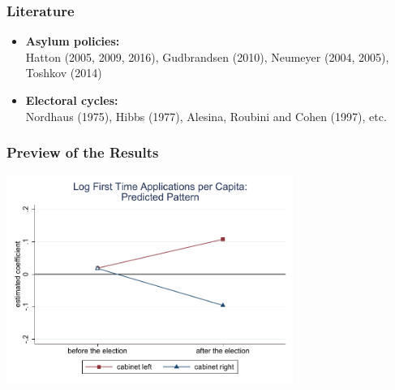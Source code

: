 \documentclass[compress, xcolor = {table,xcdraw}]{beamer}
\begin{document}
\begin{frame} [t]
\frametitle{Literature}
\begin{itemize}
	\item \textbf{Asylum policies:}\\
	\smallskip
	Hatton (2005, 2009, 2016), Gudbrandsen (2010), Neumeyer (2004, 2005), Toshkov (2014)
	
	\bigskip
		
	\item \textbf{Electoral cycles:}\\
	\smallskip
	Nordhaus (1975), Hibbs (1977), Alesina, Roubini and Cohen (1997), etc.
\end{itemize}
\end{frame}


\begin{frame} [t]
\frametitle{Preview of the Results}
\begin{center}	
	\includegraphics[width=0.7\textwidth] {../paper/inputs/app_graph1_baseline.pdf}	
\end{center}
\end{frame}
\end{document}
